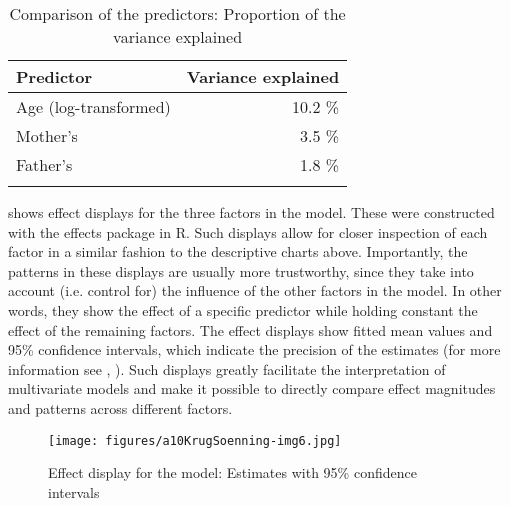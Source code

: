 \documentclass[output=paper]{langsci/langscibook}
\begin{document}
\begin{table}[p]
\caption{Comparison of the predictors: Proportion of the variance explained}
\label{tab:krug:5}
\begin{tabularx}{\textwidth}{Qr}
\lsptoprule
\bfseries Predictor & \bfseries Variance explained\\
\midrule
Age (log-transformed) &  10.2 \%\\
Mother’s  &  3.5 \%\\
Father’s  &  1.8 \%\\
\lspbottomrule
\end{tabularx}
\end{table}

 shows effect displays \citep{Fox1987} for the three factors in the model. These were constructed with the effects package \citep{Fox2016b} in R. Such displays allow for closer inspection of each factor in a similar fashion to the descriptive charts above. Importantly, the patterns in these displays are usually more trustworthy, since they take into account (i.e. control for) the influence of the other factors in the model. In other words, they show the effect of a specific predictor while holding constant the effect of the remaining factors. The effect displays show fitted mean values and 95\% confidence intervals, which indicate the precision of the estimates (for more information see \citealt[172-177]{FoxWeisberg2011}, \citealt{Fox2016a}). Such displays greatly facilitate the interpretation of multivariate models and make it possible to directly compare effect magnitudes and patterns across different factors.

  

 
\begin{figure}
\texttt{[image: figures/a10KrugSoenning-img6.jpg]}
\caption{Effect display for the model: Estimates with 95\% confidence intervals}
\label{fig:krug:6}
\end{figure}
\end{document}
